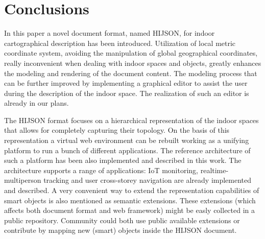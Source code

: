 \section{Conclusions}\label{conclusions}

In this paper a novel document format, named HIJSON, for indoor cartographical description has been
introduced. Utilization of local metric coordinate system,
avoiding the manipulation of global geographical coordinates, really inconvenient when
dealing with indoor spaces and objects, greatly enhances the modeling and rendering
of the document content. The modeling process that can be further improved by implementing a
graphical editor to assist the user during the description of the indoor
space. The realization of such an editor is already in our plans.

The HIJSON format focuses on a hierarchical representation of the indoor
spaces that allows for completely capturing their topology. On the basis of
this representation a virtual web environment can be rebuilt working as a
unifying platform to run a bunch of different applications. The reference
architecture of such a platform has been also implemented and described in
this work. The architecture supports a range of applications: IoT monitoring,
realtime-multiperson tracking and user cross-storey navigation are already
implemented and described. A very convenient way to extend the representation
capabilities of smart objects is also mentioned as semantic extensions. These
extensions (which affects both document format and web framework) might be
easly collected in a public repository. Community could both use public
available extensions or contribute by mapping new (smart) objects inside the
HIJSON document.
